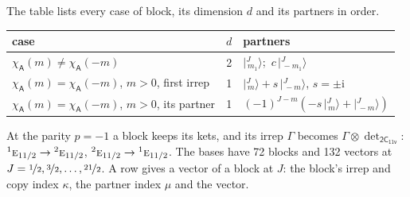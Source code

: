 \documentclass[10pt,a4paper]{article}
\numberwithin{equation}{section}
\newcommand{\grp}[1]{\mathsf{#1}}
\newcommand{\irr}[1]{\text{\normalfont\scshape #1}}
\newcommand{\conjpair}[1]{{}^{#1}}
\newcommand{\iunit}{\mathrm{i}}
\newcommand{\chiA}{\chi_{\grp{A}}}
\newcommand{\irrprod}{\otimes}
\newcommand{\mult}{\kappa}
\newcommand{\intx}{\mu}
\newcommand{\jm}[2]{\bigl\lvert{}^{#1}_{\,#2}\bigr\rangle}
\begin{document}
\leavevmode\label{n:head.case}\label{n:head.partners}The table lists every case of block, its dimension $d$ and its partners in order.
\begin{center}\begin{tabular}{@{}lrl@{}}\toprule
case & $d$ & partners\\\midrule
$\chiA(m) \ne \chiA(-m)$ & 2 & $\jm{J}{m_1}$;\ $c\,\jm{J}{-m_1}$\\
$\chiA(m) = \chiA(-m)$, $m > 0$, first irrep & 1 & $\jm{J}{m} + s\,\jm{J}{-m}$, $s = \pm\iunit$\\
$\chiA(m) = \chiA(-m)$, $m > 0$, its partner & 1 & $(-1)^{J-m}(-s\,\jm{J}{m} + \jm{J}{-m})$\\
\bottomrule\end{tabular}\end{center}
\leavevmode\label{n:operator.determinant.character}At the parity $p = -1$ a block keeps its kets, and its irrep $\Gamma$ becomes $\Gamma \irrprod \det_{\grp{2C_{11v}}}$: $\conjpair{1}\irr{e}_{11/2} \to \conjpair{2}\irr{e}_{11/2}$, $\conjpair{2}\irr{e}_{11/2} \to \conjpair{1}\irr{e}_{11/2}$.
The bases have 72 blocks and 132 vectors at $J = \nicefrac{1}{2}, \nicefrac{3}{2}, \dots, \nicefrac{21}{2}$. \label{n:head.vector}A row gives a vector of a block at $J$: the block's irrep and copy index $\mult$, the partner index $\intx$ and the vector.
\end{document}
